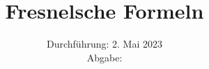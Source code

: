 

\subject{\texorpdfstring{\vspace{2ex}}{}V407\texorpdfstring{\vspace{-2ex}}{}} %
\title{Fresnelsche Formeln} %
\date{
	Durchführung: 2. Mai 2023 %
	\\ Abgabe:%
}




\maketitle
\thispagestyle{empty}


\tableofcontents
\newpage







\printbibliography{}

\newpage




